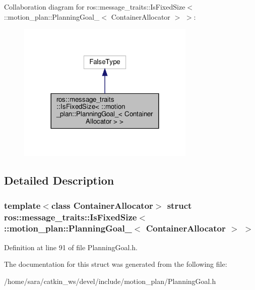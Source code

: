 Collaboration diagram for ros\+:\+:message\+\_\+traits\+:\+:Is\+Fixed\+Size$<$ \+:\+:motion\+\_\+plan\+:\+:Planning\+Goal\+\_\+$<$ Container\+Allocator $>$ $>$\+:
\nopagebreak
\begin{figure}[H]
\begin{center}
\leavevmode
\includegraphics[width=240pt]{structros_1_1message__traits_1_1IsFixedSize_3_01_1_1motion__plan_1_1PlanningGoal___3_01Container896645205f67b3f2c97fb023e12ce985}
\end{center}
\end{figure}


\subsection{Detailed Description}
\subsubsection*{template$<$class Container\+Allocator$>$\newline
struct ros\+::message\+\_\+traits\+::\+Is\+Fixed\+Size$<$ \+::motion\+\_\+plan\+::\+Planning\+Goal\+\_\+$<$ Container\+Allocator $>$ $>$}



Definition at line 91 of file Planning\+Goal.\+h.



The documentation for this struct was generated from the following file\+:\begin{DoxyCompactItemize}
\item 
/home/sara/catkin\+\_\+ws/devel/include/motion\+\_\+plan/Planning\+Goal.\+h\end{DoxyCompactItemize}

